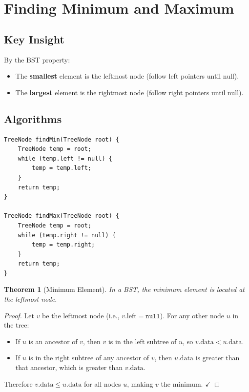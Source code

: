 \documentclass[10pt,journal,compsoc,onecolumn]{IEEEtran}
\newtheorem{theorem}{Theorem}
\begin{document}
\section{Finding Minimum and Maximum}
\label{sec:minmax}

\subsection{Key Insight}

By the BST property:
\begin{itemize}
    \item The \textbf{smallest} element is the leftmost node (follow left pointers until null).
    \item The \textbf{largest} element is the rightmost node (follow right pointers until null).
\end{itemize}

\subsection{Algorithms}

\begin{verbatim}
TreeNode findMin(TreeNode root) {
    TreeNode temp = root;
    while (temp.left != null) {
        temp = temp.left;
    }
    return temp;
}

TreeNode findMax(TreeNode root) {
    TreeNode temp = root;
    while (temp.right != null) {
        temp = temp.right;
    }
    return temp;
}
\end{verbatim}

\begin{theorem}[Minimum Element]
In a BST, the minimum element is located at the leftmost node.
\end{theorem}

\begin{proof}
Let $v$ be the leftmost node (i.e., $v.\text{left} = \texttt{null}$). For any other node $u$ in the tree:
\begin{itemize}
    \item If $u$ is an ancestor of $v$, then $v$ is in the left subtree of $u$, so $v.\text{data} < u.\text{data}$.
    \item If $u$ is in the right subtree of any ancestor of $v$, then $u.\text{data}$ is greater than that ancestor, which is greater than $v.\text{data}$.
\end{itemize}
Therefore $v.\text{data} \leq u.\text{data}$ for all nodes $u$, making $v$ the minimum. $\checkmark$
\end{proof}
\end{document}
